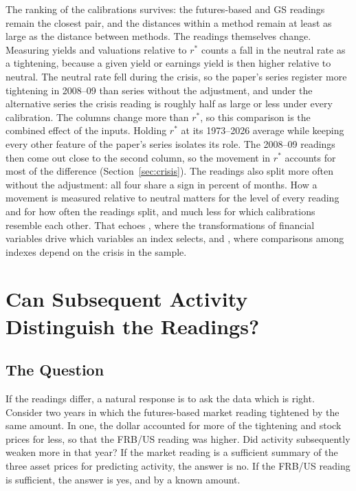 \documentclass[11pt]{article}
\begin{document}
The ranking of the calibrations survives: the futures-based and GS readings remain the closest pair, and the distances within a method remain at least as large as the distance between methods. The readings themselves change. Measuring yields and valuations relative to $r^*$ counts a fall in the neutral rate as a tightening, because a given yield or earnings yield is then higher relative to neutral. The neutral rate fell during the crisis, so the paper's series register more tightening in 2008--09 than series without the adjustment, and under the alternative series the crisis reading is roughly half as large or less under every calibration. The columns change more than $r^*$, so this comparison is the combined effect of the inputs. Holding $r^*$ at its 1973--2026 average while keeping every other feature of the paper's series isolates its role. The 2008--09 readings then come out close to the second column, so the movement in $r^*$ accounts for most of the difference (Section~\ref{sec:crisis}). The readings also split more often without the adjustment: all four share a sign in  percent of months. How a movement is measured relative to neutral matters for the level of every reading and for how often the readings split, and much less for which calibrations resemble each other. That echoes \citet{kiley2020ml}, where the transformations of financial variables drive which variables an index selects, and \citet{aramonte2013}, where comparisons among indexes depend on the crisis in the sample.
\FloatBarrier

\section{Can Subsequent Activity Distinguish the Readings?}\label{sec:outlook}
\subsection{The Question}\label{sec:onetest}
If the readings differ, a natural response is to ask the data which is right. Consider two years in which the futures-based market reading tightened by the same amount. In one, the dollar accounted for more of the tightening and stock prices for less, so that the FRB/US reading was higher. Did activity subsequently weaken more in that year? If the market reading is a sufficient summary of the three asset prices for predicting activity, the answer is no. If the FRB/US reading is sufficient, the answer is yes, and by a known amount.
\end{document}
